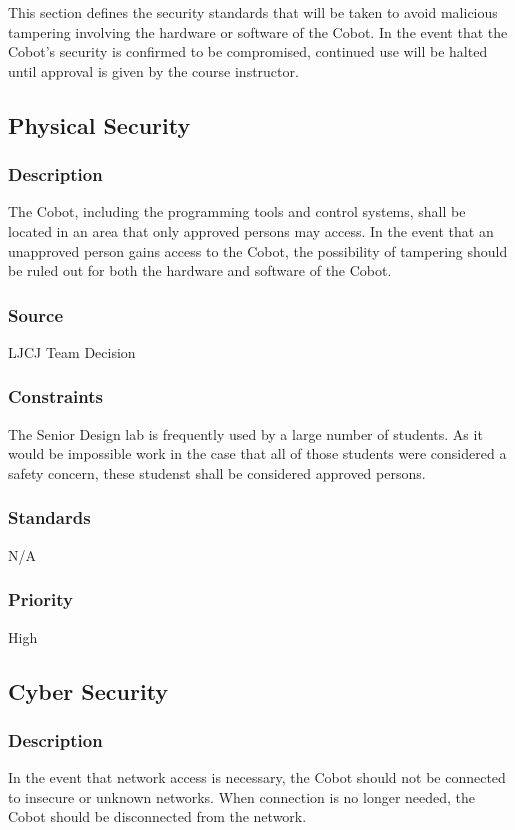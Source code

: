 This section defines the security standards that will be taken to avoid malicious tampering involving the hardware or software of the Cobot. In the event that the Cobot's security is confirmed to be compromised, continued use will be halted until approval is given by the course instructor.

\subsection{Physical Security}
\subsubsection{Description}
The Cobot, including the programming tools and control systems, shall be located in an area that only approved persons may access. In the event that an unapproved person gains access to the Cobot, the possibility of tampering should be ruled out for both the hardware and software of the Cobot.
\subsubsection{Source}
LJCJ Team Decision
\subsubsection{Constraints}
The Senior Design lab is frequently used by a large number of students. As it would be impossible work in the case that all of those students were considered a safety concern, these studenst shall be considered approved persons.
\subsubsection{Standards}
N/A
\subsubsection{Priority}
High

\subsection{Cyber Security}
\subsubsection{Description}
In the event that network access is necessary, the Cobot should not be connected to insecure or unknown networks. When connection is no longer needed, the Cobot should be disconnected from the network.


